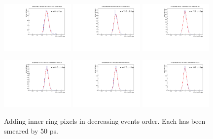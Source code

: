 \documentclass[12pt]{article}
\begin{document}
\begin{figure}[!bp]
\centering
	\includegraphics[width=0.32\textwidth]{SKIROC/SKIROC_1_Pixels_NoCenter50.pdf}
	\includegraphics[width=0.32\textwidth]{SKIROC/SKIROC_2_Pixels_NoCenter50.pdf}
	\includegraphics[width=0.32\textwidth]{SKIROC/SKIROC_3_Pixels_NoCenter50.pdf}

	\includegraphics[width=0.32\textwidth]{SKIROC/SKIROC_4_Pixels_NoCenter50.pdf}
	\includegraphics[width=0.32\textwidth]{SKIROC/SKIROC_5_Pixels_NoCenter50.pdf}
	\includegraphics[width=0.32\textwidth]{SKIROC/SKIROC_6_Pixels_NoCenter50.pdf}
	\caption{Adding inner ring pixels in decreasing events order.
		Each has been smeared by 50 ps.}
	\label{fig:50psAll_NoCenter}
\end{figure}
\end{document}
